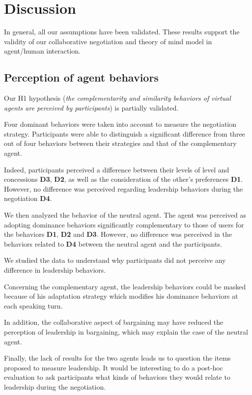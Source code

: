 \documentclass{llncs}
\begin{document}
\section{Discussion}
\label{sec:discussion}
In general, all our assumptions have been validated. These results support the validity of our collaborative negotiation and theory of mind model in agent/human interaction.   

\subsection{Perception of agent behaviors}
Our H1 hypothesis (\textit{the complementarity and similarity behaviors of virtual agents are perceived by participants}) is partially validated. 

Four dominant behaviors were taken into account to measure the negotiation strategy. 
Participants were able to distinguish a significant difference from three out of four behaviors between their strategies and that of the complementary agent.

Indeed, participants perceived a difference between their levels of level and concessions \textbf{D3}, \textbf{D2}, as well as the consideration of the other's preferences \textbf{D1}. However, no difference was perceived regarding leadership behaviors during the negotiation \textbf{D4}. 

We then analyzed the behavior of the neutral agent. The agent was perceived as adopting dominance behaviors significantly complementary to those of users for the behaviors \textbf{D1}, \textbf{D2} and \textbf{D3}. 
However, no difference was perceived in the behaviors related to \textbf{D4} between the neutral agent and the participants. 

We studied the data to understand why participants did not perceive any difference in leadership behaviors. 

Concerning the complementary agent, the leadership behaviors could be masked because of his adaptation strategy which modifies his dominance behaviors at each speaking turn.

In addition, the collaborative aspect of bargaining may have reduced the perception of leadership in bargaining, which may explain the case of the neutral agent. 

Finally, the lack of results for the two agents leads us to question the items proposed to measure leadership. 
It would be interesting to do a post-hoc evaluation to ask participants what kinds of behaviors they would relate to leadership during the negotiation.
\end{document}
